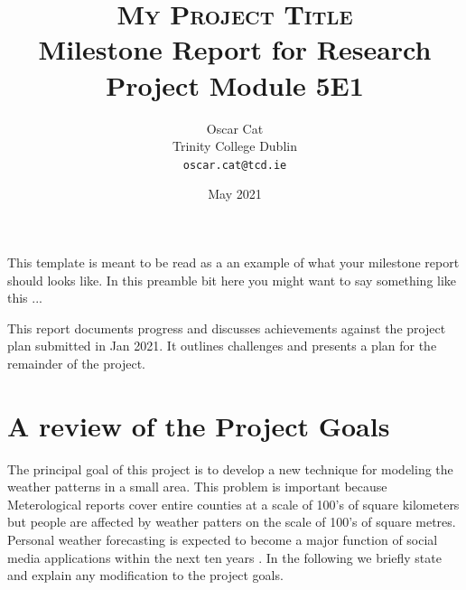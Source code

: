 \documentclass[11pt, a4paper]{article}
\begin{document}
\title{\textbf{\textsc{\Huge My Project Title}}\\ 
        {\Large Milestone Report for Research Project Module 5E1}
      }
\author{Oscar Cat \\ 
        Trinity College Dublin \\
        {\tt oscar.cat@tcd.ie}
        }

\date{May 2021}

\maketitle

\begin{center}
\end{center}


This template is meant to be read as a an example of what your milestone report should looks like. In this preamble bit here you might want to say something like this ...

This report documents progress and discusses achievements against the project plan submitted in Jan 2021. It outlines challenges and presents a plan for the remainder of the project. 

\section{A review of the Project Goals}
The principal goal of this project is to develop a new technique for modeling the weather patterns in a small area. This problem is important because Meterological reports cover entire counties at a scale of 100's of square kilometers but people are affected by weather patters on the scale of 100's of square metres. Personal weather forecasting is expected to become a major function of social media applications within the next ten years \cite{boykov_2001}. In the following we briefly state and explain any modification to the project goals.
\end{document}
